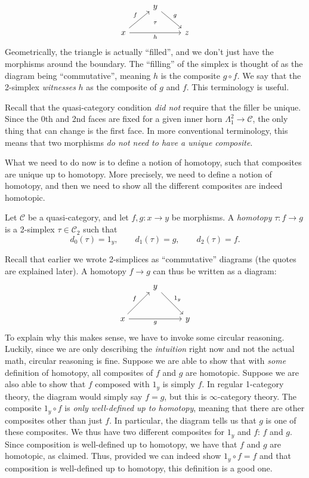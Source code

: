 \[\begin{tikzcd}
	& y \\
	x && z
	\arrow["g", from=1-2, to=2-3]
	\arrow["f", from=2-1, to=1-2]
	\arrow[""{name=0, anchor=center, inner sep=0}, "h"', from=2-1, to=2-3]
	\arrow["\tau"{description}, draw=none, from=1-2, to=0]
\end{tikzcd}\]
Geometrically, the triangle is actually ``filled'', and we don't just have the morphisms around the boundary. The ``filling'' of the simplex is thought of as the diagram being ``commutative'', meaning $h$ is the composite $g\circ f$. We say that the 2-simplex \emph{witnesses} $h$ as the composite of $g$ and $f$. This terminology is useful.

Recall that the quasi-category condition \emph{did not} require that the filler be unique. Since the 0th and 2nd faces are fixed for a given inner horn $\Lambda _1^2\to \mathcal{C} $, the only thing that can change is the first face. In more conventional terminology, this means that two morphisms \emph{do not need to have a unique composite}.

What we need to do now is to define a notion of homotopy, such that composites are unique up to homotopy. More precisely, we need to define a notion of homotopy, and then we need to show all the different composites are indeed homotopic.

\begin{definition}\label{5.3}
	Let $\mathcal{C} $ be a quasi-category, and let $f,g : x \to y$ be morphisms. A \emph{homotopy} $\tau : f \to g$ is a 2-simplex $\tau \in \mathcal{C} _2$ such that
	\[
		d_0(\tau )=1_y,\qquad d_1(\tau )=g,\qquad d_2(\tau )=f
	.\]
\end{definition}

Recall that earlier we wrote 2-simplices as ``commutative'' diagrams (the quotes are explained later). A homotopy $f\to g$ can thus be written as a diagram:
\[\begin{tikzcd}[row sep = 2.5em, column sep = 2.5em]
 & y \ar[" 1_y ", dr]  &  \\
x \ar[" f ", ur] \ar[" g "', rr]  &  & y
\end{tikzcd}\]
To explain why this makes sense, we have to invoke some circular reasoning. Luckily, since we are only describing the \emph{intuition} right now and not the actual math, circular reasoning is fine. Suppose we are able to show that with \emph{some} definition of homotopy, all composites of $f$ and $g$ are homotopic. Suppose we are also able to show that $f$ composed with $1_y$ is simply $f$. In regular 1-category theory, the diagram would simply say $f=g$, but this is $\infty $-category theory. The composite $1_y \circ f$ is \emph{only well-defined up to homotopy}, meaning that there are other composites other than just $f$. In particular, the diagram tells us that $g$ is one of these composites. We thus have two different composites for $1_y$ and $f$: $f$ and $g$. Since composition is well-defined up to homotopy, we have that $f$ and $g$ are homotopic, as claimed. Thus, provided we can indeed show $1_y\circ f=f$ and that composition is well-defined up to homotopy, this definition is a good one.

